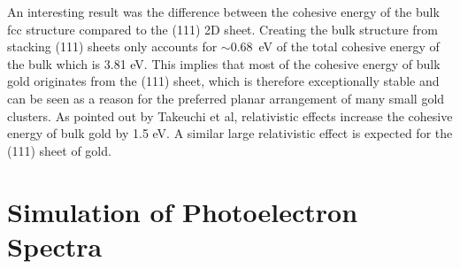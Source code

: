 An interesting result was the difference between the cohesive energy of the bulk
\ac{fcc} structure compared to the (111) 2D sheet. Creating the bulk structure
from stacking (111) sheets only accounts for $\sim$0.68~eV of the total cohesive
energy of the bulk which is 3.81 eV.\autocite{takeuchi_first-principles_1989}
This implies that most of the cohesive energy of bulk gold originates from the
(111) sheet, which is therefore exceptionally stable and can be seen as a reason
for the preferred planar arrangement of many small gold clusters. As pointed out
by Takeuchi et al, relativistic effects increase the cohesive energy of bulk
gold by 1.5 eV.\autocite{takeuchi_first-principles_1989} A similar large
relativistic effect is expected for the (111) sheet of gold.

\section{Simulation of Photoelectron Spectra}

